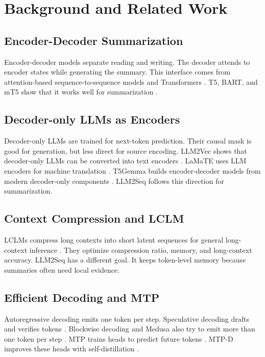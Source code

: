 \documentclass[11pt]{article}
\begin{document}
\section{Background and Related Work}
\label{sec:related}

\subsection{Encoder-Decoder Summarization}

Encoder-decoder models separate reading and writing.
The decoder attends to encoder states while generating the summary.
This interface comes from attention-based sequence-to-sequence models and Transformers \citep{sutskever2014sequence,bahdanau2015neural,vaswani2017attention}.
T5, BART, and mT5 show that it works well for summarization \citep{raffel2020t5,lewis2020bart,xue2021mt5}.

\subsection{Decoder-only LLMs as Encoders}

Decoder-only LLMs are trained for next-token prediction.
Their causal mask is good for generation, but less direct for source encoding.
LLM2Vec shows that decoder-only LLMs can be converted into text encoders \citep{behnamghader2024llm2vec}.
LaMaTE uses LLM encoders for machine translation \citep{luo2025lamate}.
T5Gemma builds encoder-decoder models from modern decoder-only components \citep{zhang2025t5gemma2}.
LLM2Seq follows this direction for summarization.

\subsection{Context Compression and LCLM}

LCLMs compress long contexts into short latent sequences for general long-context inference \citep{li2026contextcompression}.
They optimize compression ratio, memory, and long-context accuracy.
LLM2Seq has a different goal.
It keeps token-level memory because summaries often need local evidence.

\subsection{Efficient Decoding and MTP}

Autoregressive decoding emits one token per step.
Speculative decoding drafts and verifies tokens \citep{leviathan2023speculative}.
Blockwise decoding and Medusa also try to emit more than one token per step \citep{stern2018blockwise,cai2024medusa}.
MTP trains heads to predict future tokens \citep{gloeckle2024mtp}.
MTP-D improves these heads with self-distillation \citep{zhao2026mtpdistill,hinton2015distilling}.
\end{document}

